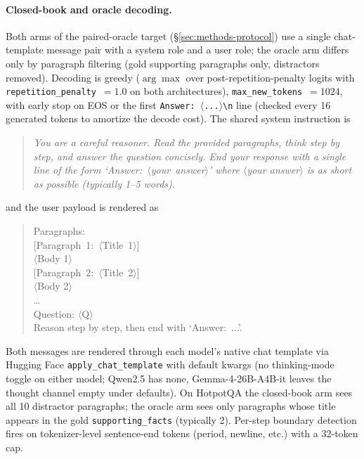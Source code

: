 \documentclass[11pt]{article}
\begin{document}
\paragraph{Closed-book and oracle decoding.} Both arms of the paired-oracle target (\S\ref{sec:methods-protocol}) use a single chat-template message pair with a system role and a user role; the oracle arm differs only by paragraph filtering (gold supporting paragraphs only, distractors removed). Decoding is greedy ($\arg\max$ over post-repetition-penalty logits with \texttt{repetition\_penalty}~$=1.0$ on both architectures), \texttt{max\_new\_tokens}~$=1024$, with early stop on EOS or the first \texttt{Answer:\,$\langle$...$\rangle$\textbackslash n} line (checked every 16 generated tokens to amortize the decode cost). The shared system instruction is

\begin{quote}\small\itshape
You are a careful reasoner. Read the provided paragraphs, think step by step, and answer the question concisely. End your response with a single line of the form \mbox{`Answer: $\langle$your answer$\rangle$'} where $\langle$your answer$\rangle$ is as short as possible (typically 1--5 words).
\end{quote}

\noindent and the user payload is rendered as

\begin{quote}\small\ttfamily
Paragraphs:\\[1pt]
\mbox{[Paragraph 1: $\langle$Title 1$\rangle$]}\\
$\langle$Body 1$\rangle$\\[1pt]
\mbox{[Paragraph 2: $\langle$Title 2$\rangle$]}\\
$\langle$Body 2$\rangle$\\[1pt]
\dots\\[1pt]
Question: $\langle$Q$\rangle$\\[1pt]
Reason step by step, then end with \mbox{`Answer: ...'}.
\end{quote}

\noindent Both messages are rendered through each model's native chat template via Hugging Face \texttt{apply\_chat\_template} with default kwargs (no thinking-mode toggle on either model; Qwen2.5 has none, Gemma-4-26B-A4B-it leaves the thought channel empty under defaults). On HotpotQA the closed-book arm sees all 10 distractor paragraphs; the oracle arm sees only paragraphs whose title appears in the gold \texttt{supporting\_facts} (typically 2). Per-step boundary detection fires on tokenizer-level sentence-end tokens (period, newline, etc.) with a 32-token cap.
\end{document}

